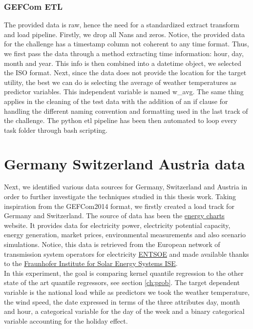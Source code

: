 \subsubsection{GEFCom ETL}
The provided data is raw, hence the need for a standardized extract transform and load pipeline. 
Firstly, we drop all Nans and zeros. Notice, the provided data for the challenge has a timestamp column not coherent to any time format. Thus, we first pass the data through a method extracting time information: hour, day, month and year. This info is then combined into a datetime object, we selected the ISO format.
Next, since the data does not provide the location for the target utility, the best we can do is selecting the average of weather temperatures as predictor variables. This independent variable is named w\_avg.
The same thing applies in the cleaning of the test data with the addition of an if clause for handling the different naming convention and formatting used in the last track of the challenge. The python etl pipeline has been then automated to loop every task folder through bash scripting.


\section{Germany Switzerland Austria data}
Next, we identified various data sources for Germany, Switzerland and Austria in order to further
investigate the techniques studied in this thesis work.
Taking inspiration from the GEFCom2014 format, we firstly created a load track for Germany and Switzerland. 
The source of data has been the \href{https://www.energy-charts.info/index.html?l=en&c=DE}{energy charts} website. It provides data for electricity power, electricity potential capacity, energy generation, market prices, environmental measurements and also scenario simulations. Notice, this data is retrieved from the European network of transmission system operators for electricity \href{https://www.entsoe.eu/}{ENTSOE} and made available thanks to the \href{https://ise.fraunhofer.de/en.html}{Fraunhofer Institute for Solar Energy Systems ISE}.
\\
In this experiment, the goal is comparing kernel quantile regression to the other state of the art quantile regressors, see section \ref{ch:prob}.
The target dependent variable is the national load while as predictors we took
the weather temperature, the wind speed, the date expressed in terms of the three attributes day, month and hour, a categorical variable for the day of the week and a binary categorical variable accounting for the holiday effect.


